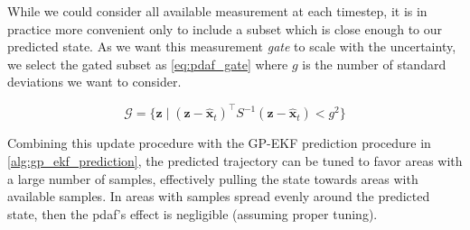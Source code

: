 While we could consider all available measurement at each timestep, it is in practice more convenient only to include a subset which is close enough to our predicted state. As we want this measurement \textit{gate} to scale with the uncertainty, we select the gated subset as \cref{eq:pdaf_gate} where $g$ is the number of standard deviations we want to consider.

\begin{equation} \label{eq:pdaf_gate}
    \mathcal{G} = \big\{ \boldsymbol{z} \; | \; (\boldsymbol{z} - \hat{\boldsymbol{x}}_t)^\intercal S^{-1} (\boldsymbol{z} - \hat{\boldsymbol{x}}_t) < g^2 \big\}
\end{equation}




Combining this update procedure with the GP-EKF prediction procedure in \cref{alg:gp_ekf_prediction}, the predicted trajectory can be tuned to favor areas with a large number of samples, effectively pulling the state towards areas with available samples. In areas with samples spread evenly around the predicted state, then the \acrshort{pdaf}'s effect is negligible (assuming proper tuning).

